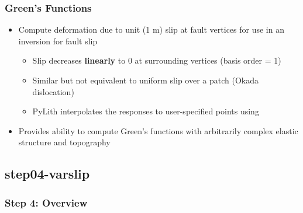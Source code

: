 \documentclass[aspectratio=169]{beamer}
\begin{document}
\begin{frame}
  \frametitle{Green's Functions}
  \summary{}

  \begin{itemize}
  \item Compute deformation due to unit (1 m) slip at fault vertices for use in an inversion for fault slip
    \begin{itemize}
    \item Slip decreases {\bf linearly} to 0 at surrounding vertices (basis order = 1)
    \item Similar but not equivalent to uniform slip over a patch (Okada dislocation)
    \item PyLith interpolates the responses to user-specified points using 
    \end{itemize}
  \item Provides ability to compute Green's functions with arbitrarily complex elastic structure and topography
  \end{itemize}
  
\end{frame}


\subsection{step04-varslip}

\begin{frame}
  \frametitle{Step 4: Overview}

      
\end{frame}
\end{document}
